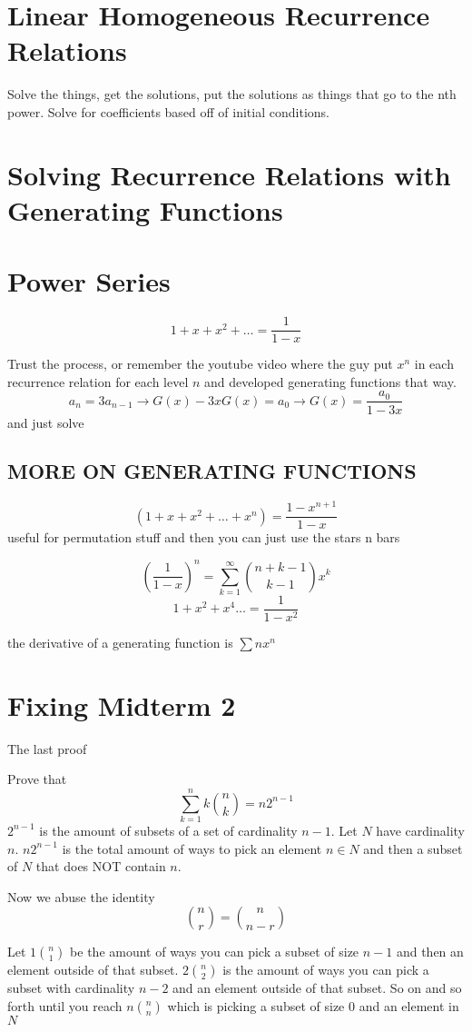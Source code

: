 \documentclass{report}
\begin{document}
\section{Linear Homogeneous Recurrence Relations}
Solve the things, get the solutions, put the solutions as things that go to the nth power. Solve for coefficients based off of initial conditions.

\section{Solving Recurrence Relations with Generating Functions}

\section{Power Series}
\[
1 + x + x^2 + \ldots = \frac{1}{1-x}
\]

Trust the process, or remember the youtube video where the guy put $x^n$ in each recurrence relation for each level $n$ and developed generating functions that way.
\[
a_n = 3a_{n-1}
\rightarrow
G(x) - 3xG(x) = a_0
\rightarrow
G(x) = \frac{a_0}{1 - 3x}
\]
and just solve

\subsection{MORE ON GENERATING FUNCTIONS}
\[
(1 + x + x^2 + \ldots + x^n) = \frac{1 - x^{n+1}}{1-x}
\]
useful for permutation stuff and then you can just use the stars n bars

\[
\left( \frac{1}{1-x} \right)^n = \sum_{k =1}^\infty {n + k - 1 \choose k - 1} x^k
\]
\[
1 + x^2 + x^4 \ldots = \frac{1}{1 - x^2}
\]

the derivative of a generating function is $\sum n x^n$

\newpage
\section{Fixing Midterm 2}
The last proof

Prove that
\[
\sum^n_{k = 1} 
k
{n \choose k}
=
n
2^{n-1}
\]
$2^{n-1}$ is the amount of subsets of a set of cardinality $n-1$. Let $N$ have cardinality $n$. $n 2^{n-1}$ is the total amount of ways to pick an element $n \in N$ and then a subset of $N$ that does NOT contain $n$.

Now we abuse the identity
\[
{n \choose r} = {n \choose n - r}
\]

Let $1 {n \choose 1}$ be the amount of ways you can pick a subset of size $n-1$ and then an element outside of that subset. $2 {n \choose 2}$ is the amount of ways you can pick a subset with cardinality $n -2$ and an element outside of that subset. So on and so forth until you reach $n {n \choose n}$ which is picking a subset of size $0$ and an element in $N$
\end{document}
